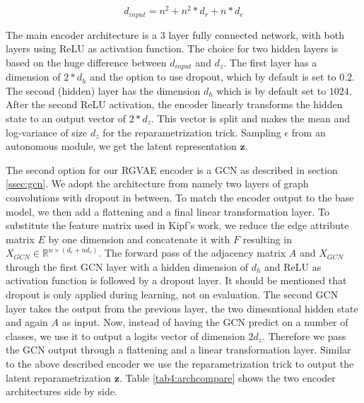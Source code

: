 \begin{equation}
    d_{input} = n^2 + n^2*d_r + n*d_e
    \label{eq4:inputdim}
\end{equation}

The main encoder architecture is a 3 layer fully connected network, with both layers using ReLU as activation function. The choice for two hidden layers is based on the huge difference between $d_{input}$ and $d_z$. The first layer has a dimension of $2*d_h$ and the option to use dropout, which by default is set to $0.2$. The second (hidden) layer has the dimension $d_h$ which is by default set to $1024$. After the second ReLU activation, the encoder linearly transforms the hidden state to an output vector of $2 *d_z$. This vector is split and makes the mean and log-variance of size $d_z$ for the reparametrization trick. Sampling $\epsilon$ from an autonomous module, we get the latent representation $\mathbf{z}$.

The second option for our RGVAE encoder is a GCN as described in section \ref{ssec:gcn}. We adopt the architecture from \cite{kipf_semi-supervised_2017} namely two layers of graph convolutions with dropout in between. To match the encoder output to the base model, we then add a flattening and a final linear transformation layer. To substitute the feature matrix used in Kipf's work, we reduce the edge attribute matrix $E$ by one dimension and concatenate it with $F$ resulting in $X_{GCN} \in \mathbb{R}^{n \times (d_e+nd_r)}$. The forward pass of the adjacency matrix $A$ and $X_{GCN}$ through the first GCN layer with a hidden dimension of $d_h$ and ReLU as activation function is followed by a dropout layer. It should be mentioned that dropout is only applied during learning, not on evaluation. The second GCN layer takes the output from the previous layer, the two dimesntional hidden state and again $A$ as input. Now, instead of having the GCN predict on a number of classes, we use it to output a logits vector of dimension $2d_z$. Therefore we pass the GCN output through a flattening and a linear transformation layer. Similar to the above described encoder we use the reparametrization trick to output the latent reparametrization $\mathbf{z}$. Table \ref{tab4:archcompare} shows the two encoder architectures side by side.


